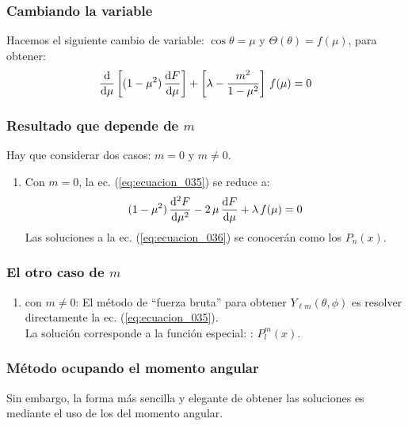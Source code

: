 \documentclass[12pt]{beamer}
\begin{document}
\begin{frame}
\frametitle{Cambiando la variable}
Hacemos el siguiente cambio de variable: $\cos \theta = \mu$ y $\Theta(\theta) = f (\mu)$, para obtener:
\pause
\begin{align}
\dv{\mu} \left[ (1 - \mu^{2}) \, \dv{F}{\mu} \right] + \left[ \lambda - \dfrac{m^{2}}{1 - \mu^{2}} \right] \, f (\mu) = 0
\label{eq:ecuacion_035}
\end{align}
\end{frame}
\begin{frame}
\frametitle{Resultado que depende de $m$}
Hay que considerar dos casos: $m = 0$ y $m \neq 0$.
\pause
{}
\begin{enumerate}[<+->]
\item Con $m = 0$, la ec. (\ref{eq:ecuacion_035}) se reduce a:
\pause
\begin{align}
(1 - \mu^{2}) \, \dv[2]{F}{\mu} - 2  \, \mu \, \dv{F}{\mu} + \lambda \, f (\mu) = 0
\label{eq:ecuacion_036}
\end{align}
\pause
Las soluciones a la ec. (\ref{eq:ecuacion_036}) se conocerán como los  $P_{n} (x)$.
\seti
\end{enumerate}
\end{frame}
\begin{frame}
\frametitle{El otro caso de $m$}
\begin{enumerate}[<+->]
\conti
\item con $m \neq 0$: \pause El método de \enquote{fuerza bruta} para obtener $Y_{\ell m} (\theta, \phi)$ es resolver directamente la ec. (\ref{eq:ecuacion_035}).
\\
\bigskip
\pause
La solución corresponde a la función especial: \textbf{}: $P_{l}^{m} (x)$.
\end{enumerate}
\end{frame}
\begin{frame}
\frametitle{Método ocupando el momento angular}
Sin embargo, \pause la forma más sencilla y elegante de obtener las soluciones es mediante el uso de los  del momento angular.
\end{frame}
\end{document}
